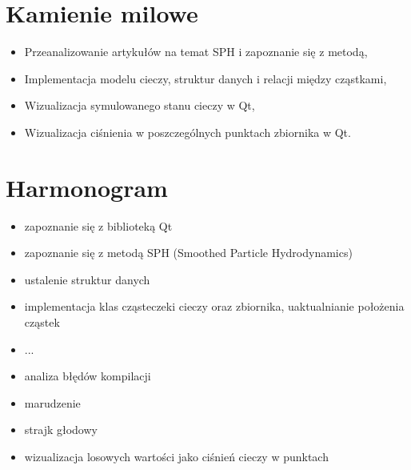\documentclass[a4paper]{article}
\begin{document}
\section{Kamienie milowe}
\begin{itemize}
  \item Przeanalizowanie artykułów na temat SPH i zapoznanie się z metodą,
  \item Implementacja modelu cieczy, struktur danych i relacji między cząstkami,
  \item Wizualizacja symulowanego stanu cieczy w Qt,
  \item Wizualizacja ciśnienia w poszczególnych punktach zbiornika w Qt.
\end{itemize}

\section{Harmonogram}
\begin{itemize}
  \item zapoznanie się z biblioteką Qt
  \item zapoznanie się z metodą SPH (Smoothed Particle Hydrodynamics)
  \item ustalenie struktur danych
  \item implementacja klas cząsteczeki cieczy oraz zbiornika, uaktualnianie położenia cząstek
  \item ...
  \item analiza błędów kompilacji
  \item marudzenie
  \item strajk głodowy
  \item wizualizacja losowych wartości jako ciśnień cieczy w punktach
\end{itemize}
\end{document}
